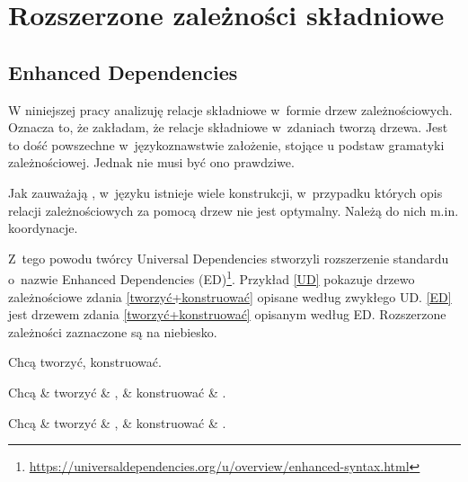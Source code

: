 \chapter{Rozszerzone zależności składniowe}

\section{Enhanced Dependencies}

W niniejszej pracy analizuję relacje składniowe w~formie drzew zależnościowych. Oznacza to, że zakładam, że relacje składniowe w~zdaniach tworzą drzewa. Jest to dość powszechne w~językoznawstwie założenie, stojące u podstaw gramatyki zależnościowej. Jednak nie musi być ono prawdziwe. 

Jak zauważają \cite{de2021universal}, w~języku istnieje wiele konstrukcji, w~przypadku których opis relacji zależnościowych za pomocą drzew nie jest optymalny. Należą do nich m.in. koordynacje.

Z~tego powodu twórcy Universal Dependencies stworzyli rozszerzenie standardu o~nazwie Enhanced Dependencies (ED)\footnote{\url{https://universaldependencies.org/u/overview/enhanced-syntax.html}}. Przykład \eqref{UD} pokazuje drzewo zależnościowe zdania \eqref{tworzyć+konstruować} opisane według zwykłego UD. \eqref{ED} jest drzewem zdania \eqref{tworzyć+konstruować} opisanym według ED. Rozszerzone zależności zaznaczone są na niebiesko.

\begin{exe}
\ex \label{tworzyć+konstruować}
Chcą tworzyć, konstruować.
 
\ex \label{UD}
\begin{dependency}[baseline=-\the\dimexpr\fontdimen22\textfont2\relax]
\begin{deptext}[column sep=1em]
Chcą \& tworzyć \& , \& konstruować \& .  \\ 
\end{deptext}
\end{dependency}

\ex \label{ED}
\begin{dependency}[baseline=-\the\dimexpr\fontdimen22\textfont2\relax]
\begin{deptext}[column sep=1em]
Chcą \& tworzyć \& , \& konstruować \& .  \\ 
\end{deptext}
\end{dependency}
\citep{przepiorkowski2018lexical}
\end{exe}

